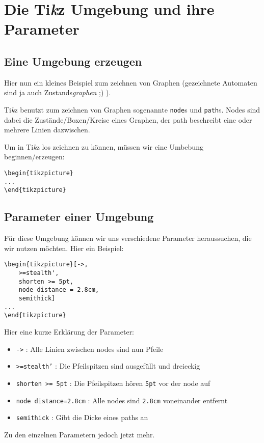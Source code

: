 \documentclass{article}
\newcommand{\logo}{Ti\textit{k}z }
\begin{document}
	\section{Die \logo Umgebung und ihre Parameter}
	\subsection{Eine Umgebung erzeugen}
		Hier nun ein kleines Beispiel zum zeichnen von Graphen (gezeichnete Automaten sind ja auch Zustands\textit{graphen} ;) ).
		
		\logo benutzt zum zeichnen von Graphen sogenannte \texttt{node}s und \texttt{path}s. Nodes sind dabei die Zustände/Boxen/Kreise eines Graphen, der path beschreibt eine oder mehrere Linien dazwischen.
		
		Um in \logo los zeichnen zu können, müssen wir eine Umbebung beginnen/erzeugen:\\
		\begin{minipage}{\linewidth}
			\begin{lstlisting}[caption={Eine einfache \logo Umgebung erstellen.}]
\begin{tikzpicture}
...
\end{tikzpicture}
			\end{lstlisting}
		\end{minipage}
	\subsection{Parameter einer Umgebung}
		Für diese Umgebung können wir uns verschiedene Parameter heraussuchen, die wir nutzen möchten. Hier ein Beispiel:\\
		\begin{minipage}{\linewidth}
			\begin{lstlisting}[caption={Ein Beispiel mit Parametern in einer \logo Umgebung.}]
\begin{tikzpicture}[->, 
	>=stealth', 
	shorten >= 5pt, 
	node distance = 2.8cm,
	semithick]
...
\end{tikzpicture}
			\end{lstlisting}
		\end{minipage}
		Hier eine kurze Erklärung der Parameter:\\
		\begin{itemize}
			\item \texttt{->} : Alle Linien zwischen nodes sind nun Pfeile
			\item \texttt{>=stealth'} : Die Pfeilspitzen sind ausgefüllt und dreieckig
			\item \texttt{shorten >= 5pt} : Die Pfeilspitzen hören \texttt{5pt} vor der node auf
			\item \texttt{node distance=2.8cm} : Alle nodes sind \texttt{2.8cm} voneinander entfernt
			\item \texttt{semithick} : Gibt die Dicke eines paths an\\
		\end{itemize}
		Zu den einzelnen Parametern jedoch jetzt mehr.
\end{document}
